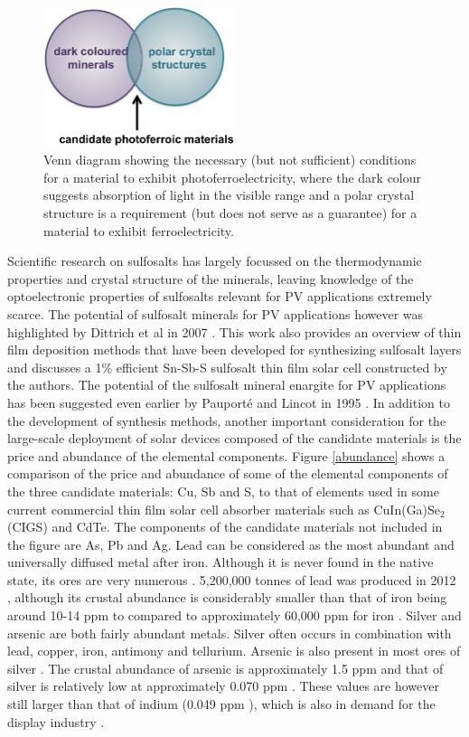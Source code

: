 \begin{figure}[h!]
  \centering
    \includegraphics[width=0.5\textwidth]{figures/venn_diagram.png}
    \caption{Venn diagram showing the necessary (but not sufficient) conditions for a material to exhibit photoferroelectricity, where the dark colour suggests absorption of light in the visible range and a polar crystal structure is a requirement (but does not serve as a guarantee) for a material to exhibit ferroelectricity.}
  \label{vd}
\end{figure}

Scientific research on sulfosalts has largely focussed on the thermodynamic properties and crystal structure of the minerals, leaving knowledge of the optoelectronic properties of sulfosalts relevant for PV applications extremely scarce. 
The potential of sulfosalt minerals for PV applications however was highlighted by Dittrich et al in 2007 \cite{Dittrich2}. This work also provides an overview of thin film deposition methods that have been developed for synthesizing sulfosalt layers and discusses a 1\% efficient Sn-Sb-S sulfosalt thin film solar cell constructed by the authors. The potential of the sulfosalt mineral enargite for PV applications has been suggested even earlier by Pauport\'{e} and Lincot in 1995 \cite{enargite_properties}. In addition to the development of synthesis methods, another important consideration for the large-scale deployment of solar devices composed of the candidate materials is the price and abundance of the elemental components. Figure \ref{abundance} shows a comparison of the price and abundance of some of the elemental components of the three candidate materials: Cu, Sb and S, to that of elements used in some current commercial thin film solar cell absorber materials such as CuIn(Ga)Se$_{2}$ (CIGS) and CdTe. The components of the candidate materials not included in the figure are As, Pb and Ag. Lead can be considered as the most abundant and universally diffused metal after iron. Although it is never found in the native state, its ores are very numerous \cite{abundance}. 5,200,000 tonnes of lead was produced in 2012 \cite{ab_prod}, although its crustal abundance is considerably smaller than that of iron being around 10-14 ppm to compared to approximately 60,000 ppm for iron \cite{ab_1}. 
Silver and arsenic are both fairly abundant metals. Silver often occurs in combination with lead, copper, iron, antimony and tellurium. Arsenic is also present in most ores of silver \cite{abundance}. The crustal abundance of arsenic is approximately 1.5 ppm and that of silver is relatively low at approximately 0.070 ppm \cite{ab_1}. These values are however still larger than that of indium (0.049 ppm \cite{ab_1}), which is also in demand for the display industry \cite{SS}.

